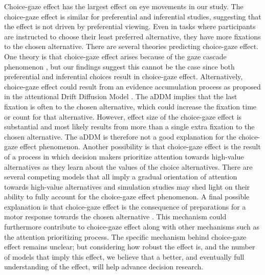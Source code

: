 Choice-gaze effect has the largest effect on eye movements in our study. The choice-gaze effect is similar for preferential and inferential studies, suggesting that the effect is not driven by preferential viewing. Even in tasks where participants are instructed to choose their least preferred alternative, they have more fixations to the chosen alternative. There are several theories predicting choice-gaze effect. One theory is that choice-gaze effect arises because of the gaze cascade phenomenon \citep{shimojo2003a}, but our findings suggest this cannot be the case since both preferential and inferential choices result in choice-gaze effect. Alternatively, choice-gaze effect could result from an evidence accumulation process as proposed in the attentional Drift Diffusion Model \citep{krajbich2010a}. The aDDM implies that the last fixation is often to the chosen alternative, which could increase the fixation time or count for that alternative. However, effect size of the choice-gaze effect is substantial and most likely results from more than a single extra fixation to the chosen alternative. The aDDM is therefore not a good explanation for the choice-gaze effect phenomenon. Another possibility is that choice-gaze effect is the result of a process in which decision makers prioritize attention towards high-value alternatives as they learn about the values of the choice alternatives. There are several competing models that all imply a gradual orientation of attention towards high-value alternatives \citep{callaway2019a, gloeckner2011a, manohar2013} and simulation studies may shed light on their ability to fully account for the choice-gaze effect phenomenon. A final possible explanation is that choice-gaze effect is the consequence of preparations for a motor response towards the chosen alternative \citep{hayhoe2014a}. This mechanism could furthermore contribute to choice-gaze effect along with other mechanisms such as the attention prioritizing process. The specific mechanism behind choice-gaze effect remains unclear; but considering how robust the effect is, and the number of models that imply this effect, we believe that a better, and eventually full understanding of the effect, will help advance decision research.

